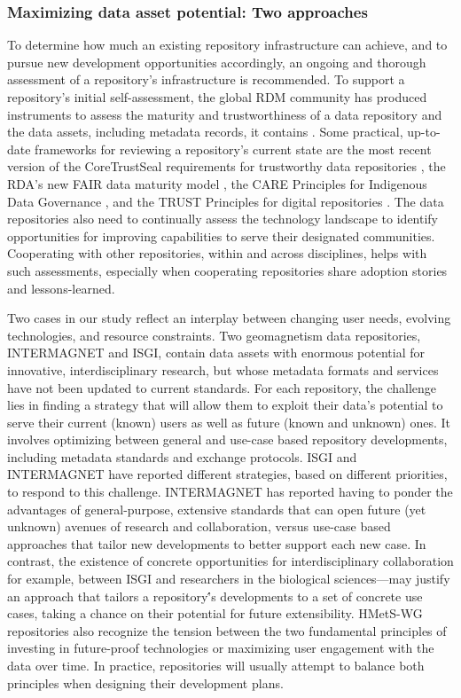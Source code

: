 \documentclass{interact}
\begin{document}
\subsubsection{Maximizing data asset potential: Two approaches}
To determine how much an existing repository infrastructure can achieve, and to pursue new development opportunities accordingly, an ongoing and thorough assessment of a repository’s infrastructure is recommended. To support a repository's initial self-assessment, the global RDM community has produced instruments to assess the maturity and trustworthiness of a data repository and the data assets, including metadata records, it contains \parencite{downs_improving_2021, peng_state_2018}. Some practical, up-to-date frameworks for reviewing a repository’s current state are the most recent version of the CoreTrustSeal requirements for trustworthy data repositories \parencite{coretrustseal_coretrustseal_2019}, the RDA’s new FAIR data maturity model \parencite{fair_data_maturity_model_wg_fair_2020}, the CARE Principles for Indigenous Data Governance \parencite{carroll_care_2020}, and the TRUST Principles for digital repositories \parencite{lin_trust_2020}. The data repositories also need to continually assess the technology landscape to identify opportunities for improving capabilities to serve their designated communities. Cooperating with other repositories, within and across disciplines, helps with such assessments, especially when cooperating repositories share adoption stories and lessons-learned.

Two cases in our study reflect an interplay between changing user needs, evolving technologies, and resource constraints.  Two geomagnetism data repositories, INTERMAGNET and ISGI, contain data assets with enormous potential for innovative, interdisciplinary research, but whose metadata formats and services have not been updated to current standards. For each repository, the challenge lies in finding a strategy that will allow them to exploit their data's potential to serve their current (known) users as well as future (known and unknown) ones. It involves optimizing between general and use-case based repository developments, including metadata standards and exchange protocols. ISGI and INTERMAGNET have reported different strategies, based on different priorities, to respond to this challenge. INTERMAGNET has reported having to ponder the advantages of general-purpose, extensive standards that can open future (yet unknown) avenues of research and collaboration, versus use-case based approaches that tailor new developments to better support each new case. In contrast, the existence of concrete opportunities for interdisciplinary collaboration for example, between ISGI and researchers in the biological sciences—may justify an approach that tailors a repository\'’s developments to a set of concrete use cases, taking a chance on their potential for future extensibility. HMetS-WG repositories also recognize the tension between the two fundamental principles of investing in future-proof technologies or maximizing user engagement with the data over time. In practice, repositories will usually attempt to balance both principles when designing their development plans.
\end{document}
